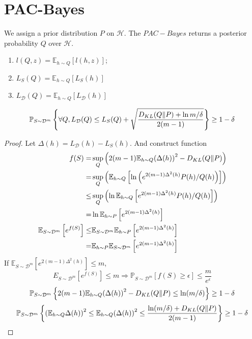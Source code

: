 
\section{PAC-Bayes}%

We assign a prior distribution $ P $ on $ \mathcal{H} $.
The $ PAC-Bayes $ returns a posterior probability $ Q $ over $ \mathcal{H} $.
\begin{enumerate}
    \item $ l(Q, z) = \mathbb{E}_{h \sim Q} \left[ l(h,z) \right] $;
    \item $ L_S(Q) = \mathbb{E}_{h \sim Q} \left[ L_S(h) \right] $
    \item $ L_\mathcal{D}(Q) = \mathbb{E}_{h \sim Q} \left[ L_{\mathcal{D}} (h) \right] $
\end{enumerate}

\begin{theorem}
    \[
        \mathbb{P}_{ S \sim \mathcal{D}^m} \left\{ \forall Q, L_{\mathcal{D}}(Q) \le L_S(Q) + \sqrt{\frac{D_{KL}(Q \Arrowvert P) + \ln m/ \delta}{2(m-1)} } \right\} \ge 1 - \delta
    \]
    \begin{proof}
        Let $ \Delta(h) = L_{\mathcal{D}}(h) - L_{S}(h) $. And construct function
        \begin{align*}
            f(S) =& \sup_{Q}\left( 2(m-1) \mathbb{E}_{h \sim Q}{(\Delta(h))}^2 - D_{KL}(Q \Arrowvert P) \right)\\
            =& \sup_{Q}\left( \mathbb{E}_{h \sim Q} \left[ \ln \left( e^{2(m-1) \Delta^2(h)} P(h) / Q(h) \right) \right] \right)\\
            \le& \sup_{Q} \left( \ln \mathbb{E}_{h \sim Q} \left[ e^{2(m-1) \Delta^2(h)} P(h) / Q(h) \right] \right)\\
            =& \ln \mathbb{E}_{h \sim P} \left[ e^{2(m-1)\Delta^2(h)} \right]\\
            \mathbb{E}_{S \sim \mathcal{D}^m}\left[ e^{f(S)} \right] 
            \le& \mathbb{E}_{S \sim \mathcal{D}^m} \mathbb{E}_{h \sim P} \left[ e^{2(m-1) \Delta^2(h)} \right]\\
            =& \mathbb{E}_{h \sim P} \mathbb{E}_{S \sim \mathcal{D}^m} \left[ e^{2(m-1) \Delta^2(h)} \right]
        \end{align*}
        If $ \mathbb{E}_{S \sim \mathcal{D}^{m}} \left[ e^{2(m-1) \Delta^2(h)} \right] \le m$,
        \[
            E_{S \sim \mathcal{D}^m} \left[ e^{f(S)} \right] \le m
            \Rightarrow
            \mathbb{P}_{S \sim \mathcal{D}^m} \left[ f(S) \ge \epsilon \right] \le \frac{m}{e^{\epsilon}} 
        \]
        \[
            \mathbb{P}_{S \sim \mathcal{D}^m} \left\{ 2(m-1) \mathbb{E}_{h \sim Q} {(\Delta (h))}^2 - D_{KL}(Q \Arrowvert P) \le \ln(m/\delta)\right\} \ge 1 - \delta
        \]
        \[
            \mathbb{P}_{S \sim \mathcal{D}^{m}} \left\{ {\left( \mathbb{E}_{h \sim Q} \Delta(h) \right)}^2 \le \mathbb{E}_{h \sim Q} {(\Delta(h))}^2 \le \frac{\ln(m/\delta) + D_{KL}(Q\Arrowvert P)}{2(m-1)}   \right\} \ge 1 - \delta
        \]
    \end{proof}
\end{theorem}

